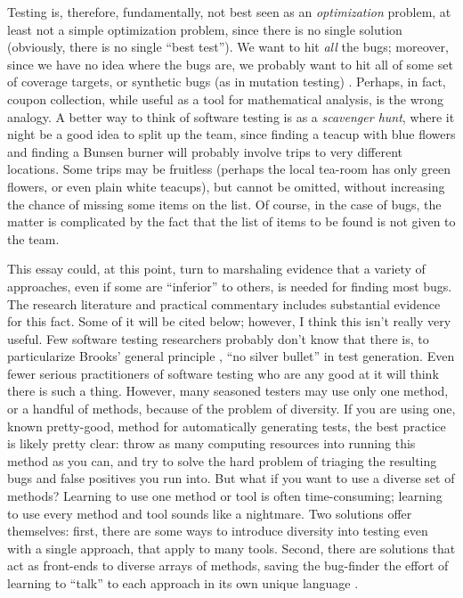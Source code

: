\documentclass[sigplan,review]{acmart}
\begin{document}
Testing is, therefore,
fundamentally, not best seen as an \emph{optimization} problem, at
least not a simple optimization problem, since
there is no single solution (obviously, there is no single ``best
test'').  We want to hit \emph{all} the bugs; moreover, since we have
no idea where the bugs are, we probably want to hit all of some set of
coverage targets, or synthetic bugs (as in mutation testing)
\cite{Discontents}.  Perhaps, in fact, coupon collection, while useful
as a tool for mathematical analysis, is the wrong analogy.  A better
way to think of software testing is as a \emph{scavenger hunt}, where
it night be a good idea to split up the team, since finding a teacup
with blue flowers and finding a Bunsen burner will probably involve
trips to very different locations.  Some trips may be fruitless
(perhaps the local tea-room has only green flowers, or even plain white
teacups), but cannot be omitted, without increasing the chance of
missing some items on the list.  Of course, in the case of bugs, the
matter is complicated by the fact that the list of items to be found
is not given to the team.

This essay could, at this point, turn to marshaling evidence that a
variety of approaches, even if some are ``inferior'' to others, is
needed for finding most bugs.  The research literature and practical
commentary includes substantial evidence for this fact.  Some of it
will be cited below; however, I think this isn't really very useful.
Few software testing researchers probably don't know that there is, to
particularize Brooks' general principle \cite{Brooks1987NoSB}, ``no silver bullet'' in test
generation.  Even fewer serious practitioners of software testing who
are any good at it will think there is such a thing.  However, many
seasoned testers may use only one method, or a handful of methods,
because of the problem of diversity.  If you are using one, known
pretty-good, method for automatically generating tests, the best
practice is likely pretty clear:  throw as many computing resources
into running this method as you can, and try to solve the hard problem
of triaging the resulting bugs and false positives you run into.  But
what if you want to use a diverse set of methods?  Learning to use one
method or tool is often time-consuming; learning to use every method
and tool sounds like a nightmare.  Two solutions offer themselves:
first, there are some ways to introduce diversity into testing even
with a single approach, that apply to many tools.  Second, there are
solutions that act as front-ends to diverse arrays of methods, saving
the bug-finder the effort of learning to ``talk'' to each approach in
its own unique language \cite{WODACommon}.
\end{document}
